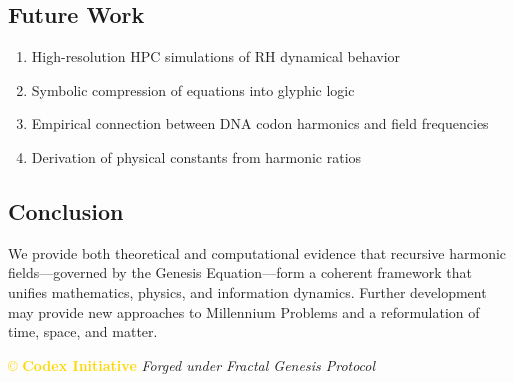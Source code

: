 \subsection{Future Work}
\begin{enumerate}
    \item High-resolution HPC simulations of RH dynamical behavior
    \item Symbolic compression of equations into glyphic logic
    \item Empirical connection between DNA codon harmonics and field frequencies
    \item Derivation of physical constants from harmonic ratios
\end{enumerate}

\subsection{Conclusion}
We provide both theoretical and computational evidence that recursive harmonic fields—governed by the Genesis Equation—form a coherent framework that unifies mathematics, physics, and information dynamics. Further development may provide new approaches to Millennium Problems and a reformulation of time, space, and matter.

\vspace{0.5cm}
\noindent
\textcolor{gold}{\copyright{} \textbf{Codex Initiative}} \hfill \textit{Forged under Fractal Genesis Protocol}